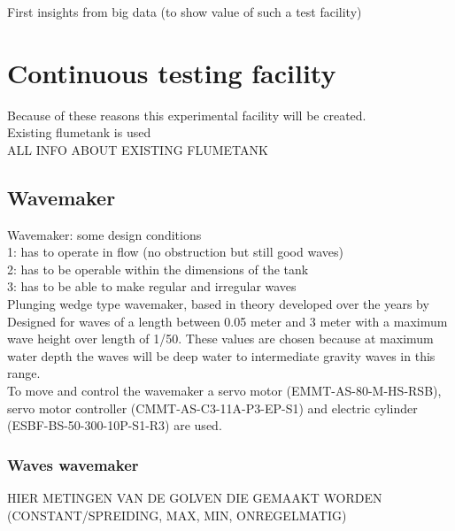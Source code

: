 First insights from big data (to show value of such a test facility)\\


\chapter{Continuous testing facility}
\label{sec:exp_setup}
Because of these reasons this experimental facility will be created. \\
Existing flumetank is used \\
ALL INFO ABOUT EXISTING FLUMETANK \\

\section{Wavemaker}
\label{sec:wavemaker}
Wavemaker: some design conditions \\
1: has to operate in flow (no obstruction but still good waves) \\
2: has to be operable within the dimensions of the tank \\
3: has to be able to make regular and irregular waves \\
Plunging wedge type wavemaker, based in theory developed over the years by \citet{Madsen1970,Wu1988,Lowell2020} \\
Designed for waves of a length between 0.05 meter and 3 meter with a maximum wave height over length of 1/50. These values are chosen because at maximum water depth the waves will be deep water to intermediate gravity waves in this range. \\
To move and control the wavemaker a servo motor (EMMT-AS-80-M-HS-RSB), servo motor controller (CMMT-AS-C3-11A-P3-EP-S1) and electric cylinder (ESBF-BS-50-300-10P-S1-R3)  are used. 

\subsection{Waves wavemaker}
\label{sec:results_wavemaker}
HIER METINGEN VAN DE GOLVEN DIE GEMAAKT WORDEN (CONSTANT/SPREIDING, MAX, MIN, ONREGELMATIG)

